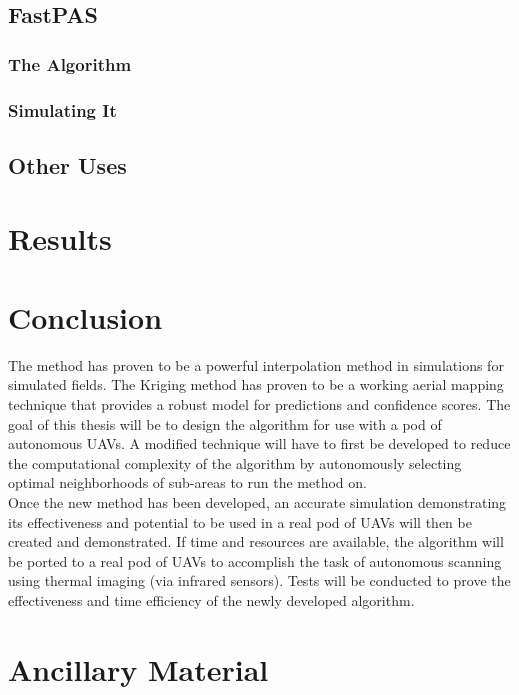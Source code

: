 \documentclass[11pt]{ucthesis}
\begin{document}
\section{FastPAS}
\subsection{The Algorithm}
\subsection{Simulating It}

\section{Other Uses}

\chapter{Results}

\chapter{Conclusion}
The method has proven to be a powerful interpolation method in simulations for simulated fields. The Kriging method has proven to be a working aerial mapping technique that provides a robust model for predictions and confidence scores. The goal of this thesis will be to design the algorithm for use with a pod of autonomous UAVs. A modified technique will have to first be developed to reduce the computational complexity of the algorithm by autonomously selecting optimal neighborhoods of sub-areas to run the method on.\\
Once the new method has been developed, an accurate simulation demonstrating its effectiveness and potential to be used in a real pod of UAVs will then be created and demonstrated. 
If time and resources are available, the algorithm will be ported to a real pod of UAVs to accomplish the task of autonomous scanning using thermal imaging (via infrared sensors). Tests will be conducted to prove the effectiveness and time efficiency of the newly developed algorithm.

\nocite{*}



\appendix
\chapter{Ancillary Material}
\end{document}
